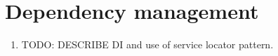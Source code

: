 \section{Dependency management}

\begin{enumerate}
    \color{red}
    \item TODO: DESCRIBE DI and use of service locator pattern.
\end{enumerate}